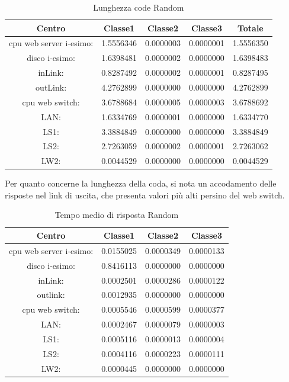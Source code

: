 \begin{table}[H]
\begin{center}
\begin{tabular}{||c|c|c|c|c||}
\hline
Centro &Classe1 &Classe2 &Classe3 &Totale\\
\hline
\hline
 cpu web server i-esimo: 	&1.5556346	&0.0000003	&0.0000001	&1.5556350\\
\hline
 disco i-esimo: 	&1.6398481	&0.0000002	&0.0000000	&1.6398483\\
\hline
 inLink: 	&0.8287492	&0.0000002	&0.0000001	&0.8287495\\
\hline
 outLink: 	&4.2762899	&0.0000000	&0.0000000	&4.2762899\\
\hline
 cpu web switch: 	&3.6788684	&0.0000005	&0.0000003	&3.6788692\\
\hline
 LAN: 	&1.6334769	&0.0000001	&0.0000000	&1.6334770\\
\hline
 LS1: 	&3.3884849	&0.0000000	&0.0000000	&3.3884849\\
\hline
 LS2: 	&2.7263059	&0.0000002	&0.0000001	&2.7263062\\
\hline
 LW2: 	&0.0044529	&0.0000000	&0.0000000	&0.0044529\\
\hline
\end{tabular}
\end{center}
\caption{Lunghezza code Random}
\label{ris}
\end{table}
Per quanto concerne la lunghezza della coda, si nota un accodamento delle risposte nel link di uscita, che presenta valori più alti persino del web switch.
\begin{table}[htbp]
\begin{center}
\begin{tabular}{||c|c|c|c||}
\hline
Centro &Classe1 &Classe2 &Classe3\\
\hline
\hline
 cpu web server i-esimo: 	&0.0155025	&0.0000349	&0.0000133\\
\hline
 disco i-esimo: 	&0.8416113	&0.0000000	&0.0000000\\
\hline
 inLink: 	&0.0002501	&0.0000286	&0.0000122\\
\hline
 outlink: 	&0.0012935	&0.0000000	&0.0000000\\
\hline
 cpu web switch: 	&0.0005546	&0.0000599	&0.0000377\\
\hline
 LAN: 	&0.0002467	&0.0000079	&0.0000003\\
\hline
 LS1: 	&0.0005116	&0.0000013	&0.0000004\\
\hline
 LS2: 	&0.0004116	&0.0000223	&0.0000111\\
\hline
 LW2: 	&0.0000445	&0.0000000	&0.0000000\\
\hline
\end{tabular}
\end{center}
\caption{Tempo medio di risposta Random}
\label{tempomediorisposta}
\end{table}
